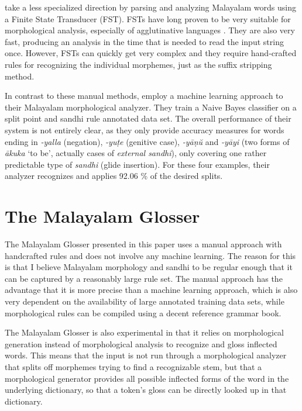 \documentclass[a4paper]{article}
\begin{document}
\textcite{manju2009pos} take a less specialized direction by parsing and analyzing Malayalam words using a Finite State Transducer (FST). FSTs have long proven to be very suitable for morphological analysis, especially of agglutinative languages \parencite{fsm}. They are also very fast, producing an analysis in the time that is needed to read the input string once. However, FSTs can quickly get very complex and they require hand-crafted rules for recognizing the individual morphemes, just as the suffix stripping method.

In contrast to these manual methods, \textcite{sebastian2018morph} employ a machine learning approach to their Malayalam morphological analyzer. They train a Naive Bayes classifier on a split point and sandhi rule annotated data set. The overall performance of their system is not entirely clear, as they only provide accuracy measures for words ending in \textit{-yalla} (negation), \textit{-yuṭe} (genitive case), \textit{-yāṇŭ} and \textit{-yāyi} (two forms of \textit{ākuka} `to be', actually cases of \textit{external sandhi}), only covering one rather predictable type of \textit{sandhi} (glide insertion). For these four examples, their analyzer recognizes and applies 92.06 \% of the desired splits.

\section{The Malayalam Glosser}

The Malayalam Glosser presented in this paper uses a manual approach with handcrafted rules and does not involve any machine learning. The reason for this is that I believe Malayalam morphology and sandhi to be regular enough that it can be captured by a reasonably large rule set. The manual approach has the advantage that it is more precise than a machine learning approach, which is also very dependent on the availability of large annotated training data sets, while morphological rules can be compiled using a decent reference grammar book.

The Malayalam Glosser is also experimental in that it relies on morphological generation instead of morphological analysis to recognize and gloss inflected words. This means that the input is not run through a morphological analyzer that splits off morphemes trying to find a recognizable stem, but that a morphological generator provides all possible inflected forms of the word in the underlying dictionary, so that a token's gloss can be directly looked up in that dictionary.
\end{document}
